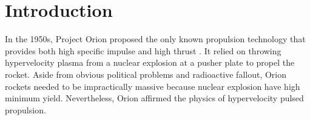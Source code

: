 \documentclass{article}
\begin{document}
\section{Introduction}
In the 1950s, Project Orion proposed the only known propulsion technology that provides both high specific impulse and high thrust \cite{projorion}.  It relied on throwing hypervelocity plasma from a nuclear explosion at a pusher plate to propel the rocket.  Aside from obvious political problems and radioactive fallout, Orion rockets needed to be impractically massive because nuclear explosion have high minimum yield.  Nevertheless, Orion affirmed the physics of hypervelocity pulsed propulsion.

  
  
\end{document}
